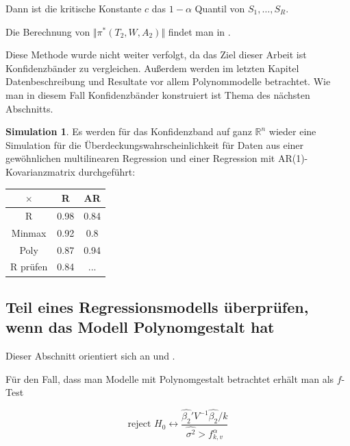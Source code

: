 \documentclass[12pt,a4paper]{article}
\theoremstyle{definition}
\theoremstyle{definition}
\theoremstyle{definition}
\newtheorem{Simulation}[Definition]{Simulation}
\theoremstyle{definition}
\newcommand{\UeberRR}{0.98}
\newcommand{\UeberRMinmax}{0.92}
\newcommand{\UeberRMinmaxPoly}{0.87}
\newcommand{\UeberARR}{0.84}
\newcommand{\UeberARMinmax}{0.8}
\newcommand{\UeberARMinmaxPoly}{0.94}
\newcommand{\UeberRRpruefen}{0.84}
\newcommand{\UeberARRpruefen}{...}
\begin{document}
Dann ist die kritische Konstante $c$ das $1-\alpha$ Quantil von $S_1, \ldots, S_R$.

Die Berechnung von $\Vert \pi^{*}(T_2,W,A_2) \Vert$ findet man in \cite[Appendix B]{Liu64}.

Diese Methode wurde nicht weiter verfolgt, da das Ziel dieser Arbeit ist Konfidenzbänder zu vergleichen. Außerdem werden im letzten Kapitel Datenbeschreibung und Resultate vor allem Polynommodelle betrachtet. Wie man in diesem Fall Konfidenzbänder konstruiert ist Thema des nächsten Abschnitts.

\begin{Simulation}
Es werden für das Konfidenzband auf ganz $\mathbb{R}^n$ wieder eine Simulation für die Überdeckungswahrscheinlichkeit für Daten aus einer gewöhnlichen multilinearen Regression und einer Regression mit AR(1)-Kovarianzmatrix durchgeführt:

\begin{center}
\begin{tabular}{|c|c|c|}
\hline 
$\times$ & R & AR \\ 
\hline 
R		& \UeberRR			& \UeberARR \\ 
\hline 
Minmax	& \UeberRMinmax	 	& \UeberARMinmax \\ 
\hline 
Poly 	& \UeberRMinmaxPoly & \UeberARMinmaxPoly \\ 
\hline 
R prüfen	& \UeberRRpruefen & \UeberARRpruefen \\ 
\hline 
\end{tabular} 
\end{center}

\end{Simulation}



\subsection{Teil eines Regressionsmodells überprüfen, wenn das Modell Polynomgestalt hat}
\label{Teil eines Regressionsmodells überpruefen, wenn das Modell Polynomgestalt hat}
Dieser Abschnitt orientiert sich an \cite[190-192]{Liu64} und \cite{Draper98}.

Für den Fall, dass man Modelle mit Polynomgestalt betrachtet erhält man als $f$-Test

\begin{equation}\label{KB hypo prüfen}
\text{reject } H_0 \leftrightarrow \frac{\hat{\beta_2}' V^{-1} \hat{\beta_2}/k}{\widehat{\sigma^2} > f^{\alpha}_{k,v}}
\end{equation}
\end{document}
